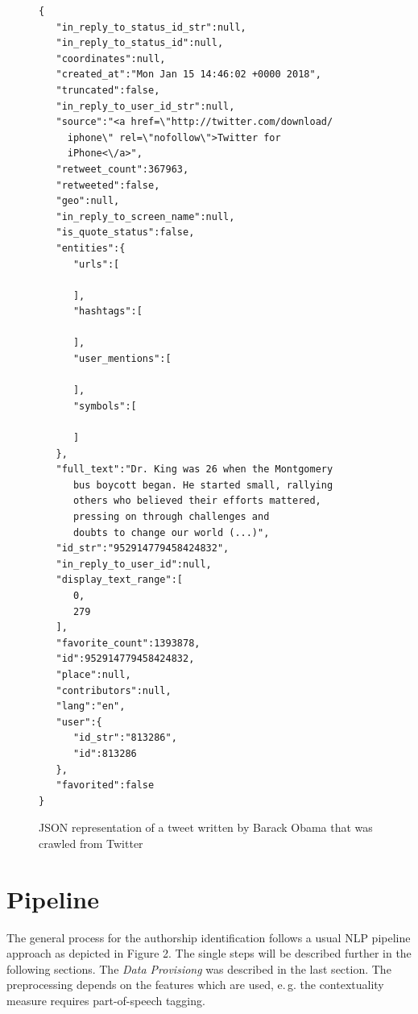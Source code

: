 \documentclass[journal, a4paper, 12pt]{IEEEtran}
\begin{document}
\begin{figure}
\caption{JSON representation of a tweet written by Barack Obama that was crawled from Twitter}
\tiny
\begin{verbatim}
{  
   "in_reply_to_status_id_str":null,
   "in_reply_to_status_id":null,
   "coordinates":null,
   "created_at":"Mon Jan 15 14:46:02 +0000 2018",
   "truncated":false,
   "in_reply_to_user_id_str":null,
   "source":"<a href=\"http://twitter.com/download/
     iphone\" rel=\"nofollow\">Twitter for
     iPhone<\/a>",
   "retweet_count":367963,
   "retweeted":false,
   "geo":null,
   "in_reply_to_screen_name":null,
   "is_quote_status":false,
   "entities":{  
      "urls":[  

      ],
      "hashtags":[  

      ],
      "user_mentions":[  

      ],
      "symbols":[  

      ]
   },
   "full_text":"Dr. King was 26 when the Montgomery
      bus boycott began. He started small, rallying
      others who believed their efforts mattered,
      pressing on through challenges and
      doubts to change our world (...)",
   "id_str":"952914779458424832",
   "in_reply_to_user_id":null,
   "display_text_range":[  
      0,
      279
   ],
   "favorite_count":1393878,
   "id":952914779458424832,
   "place":null,
   "contributors":null,
   "lang":"en",
   "user":{  
      "id_str":"813286",
      "id":813286
   },
   "favorited":false
}
\end{verbatim}
\normalsize
\end{figure}

\section{Pipeline}
\label{sec:pipeline}
The general process for the authorship identification follows a usual NLP pipeline approach as depicted in Figure 2. The single steps will be described further in the following sections. The \textit{Data Provisiong} was described in the last section. The preprocessing depends on the features which are used, e.\,g. the contextuality measure requires part-of-speech tagging.
\end{document}
